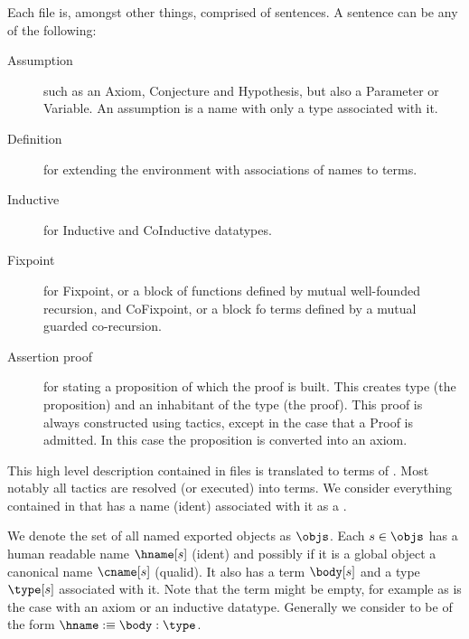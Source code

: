 Each file is, amongst other things, comprised of sentences.
A sentence can be any of the following:
\begin{description}
	\item[Assumption] such as an Axiom, Conjecture and Hypothesis, but also a Parameter or Variable.
		An assumption is a name with only a type associated with it.
	\item[Definition] for extending the environment with associations of names to terms.
		
	\item[Inductive] for Inductive and CoInductive datatypes.
	\item[Fixpoint] for Fixpoint, or a block of functions defined by mutual well-founded recursion, and CoFixpoint, or a block fo terms defined by a mutual guarded co-recursion.
	\item[Assertion proof] for stating a proposition of which the proof is built.
		This creates type (the proposition) and an inhabitant of the type (the proof).
		This proof is always constructed using tactics, except in the case that a Proof is admitted.
		In this case the proposition is converted into an axiom.
\end{description}

This high level description contained in \coq files is translated to terms of \pcic.
Most notably all tactics are resolved (or executed) into terms.
We consider everything contained in \pcic that has a name (ident) associated with it as a \coqobj.

\begin{definition}[{\coqobj[s]}]
	We denote the set of all named exported \coq objects as $\objs$.
	Each \coqobj $s \in \objs$ has a human readable name $\hname[s]$ (ident) and possibly if it is a global object a canonical name $\cname[s]$ (qualid).
	It also has a term $\body[s]$ and a type $\type[s]$ associated with it.
	Note that the term might be empty, for example as is the case with an axiom or an inductive datatype.
	Generally we consider \coqobj[s] to be of the form $\hname :\equiv \body : \type$.
\end{definition}
